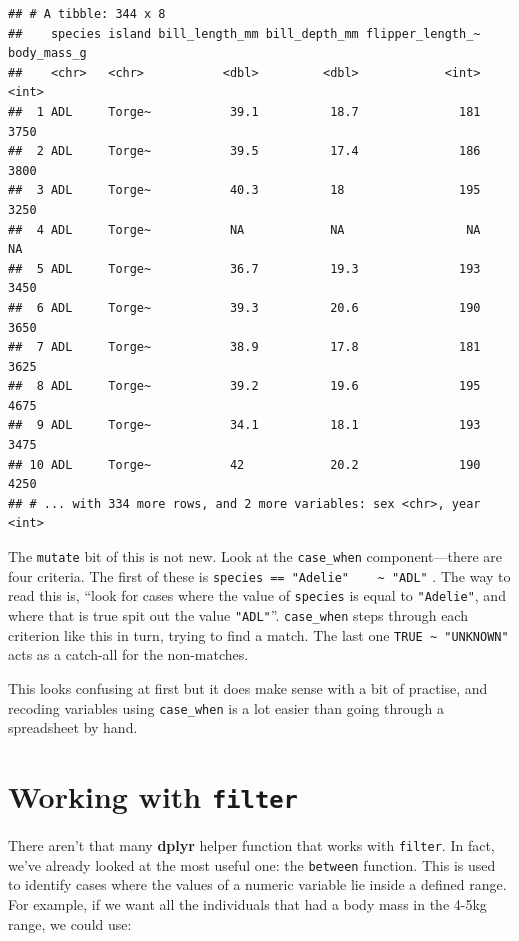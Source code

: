 \documentclass[
]{book}
\begin{document}
\begin{verbatim}
## # A tibble: 344 x 8
##    species island bill_length_mm bill_depth_mm flipper_length_~ body_mass_g
##    <chr>   <chr>           <dbl>         <dbl>            <int>       <int>
##  1 ADL     Torge~           39.1          18.7              181        3750
##  2 ADL     Torge~           39.5          17.4              186        3800
##  3 ADL     Torge~           40.3          18                195        3250
##  4 ADL     Torge~           NA            NA                 NA          NA
##  5 ADL     Torge~           36.7          19.3              193        3450
##  6 ADL     Torge~           39.3          20.6              190        3650
##  7 ADL     Torge~           38.9          17.8              181        3625
##  8 ADL     Torge~           39.2          19.6              195        4675
##  9 ADL     Torge~           34.1          18.1              193        3475
## 10 ADL     Torge~           42            20.2              190        4250
## # ... with 334 more rows, and 2 more variables: sex <chr>, year <int>
\end{verbatim}

The \texttt{mutate} bit of this is not new. Look at the \texttt{case\_when} component---there are four criteria. The first of these is \texttt{species\ ==\ "Adelie"\ \ \ \ \textasciitilde{}\ "ADL"} . The way to read this is, ``look for cases where the value of \texttt{species} is equal to \texttt{"Adelie"}, and where that is true spit out the value \texttt{"ADL"}''. \texttt{case\_when} steps through each criterion like this in turn, trying to find a match. The last one \texttt{TRUE\ \textasciitilde{}\ "UNKNOWN"} acts as a catch-all for the non-matches.

This looks confusing at first but it does make sense with a bit of practise, and recoding variables using \texttt{case\_when} is a lot easier than going through a spreadsheet by hand.

\hypertarget{working-with-filter}{%
\section{\texorpdfstring{Working with \texttt{filter}}{Working with filter}}\label{working-with-filter}}

There aren't that many \textbf{dplyr} helper function that works with \texttt{filter}. In fact, we've already looked at the most useful one: the \texttt{between} function. This is used to identify cases where the values of a numeric variable lie inside a defined range. For example, if we want all the individuals that had a body mass in the 4-5kg range, we could use:
\end{document}

